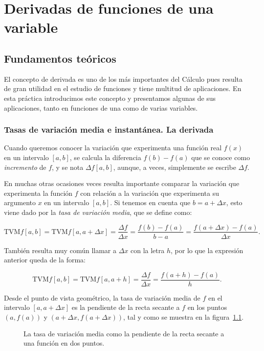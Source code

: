 \chapter{Derivadas de funciones de una variable}

\section{Fundamentos teóricos}
El concepto de derivada es uno de los más importantes del Cálculo
pues resulta de gran utilidad en el estudio de funciones y tiene
multitud de aplicaciones. En esta práctica introducimos este
concepto y presentamos algunas de sus aplicaciones, tanto en
funciones de una como de varias variables.

\subsection{Tasas de variación media e instantánea. La derivada}
Cuando queremos conocer la variación que experimenta una función
real $f(x)$ en un intervalo $[a,b]$, se calcula la diferencia
$f(b)-f(a)$ que se conoce como \emph{incremento} de $f$, y se nota
$\Delta f[a,b]$, aunque, a veces, simplemente se escribe $\Delta f$.

En muchas otras ocasiones veces resulta importante comparar la
variación que experimenta la función $f$ con relación a la variación
que experimenta su argumento $x$ en un intervalo $[a,b]$. Si tenemos
en cuenta que $b=a+\Delta x$, esto viene dado por la \emph{tasa de
variación media}, que se define como:

\[
\textrm{TVM} f[a,b]=\textrm{TVM} f[a,a+\Delta x]=\frac{\Delta
f}{\Delta x}=\frac{f(b)-f(a)}{b-a}=\frac{f(a+\Delta x )-f(a)}{\Delta
x}.
\]

También resulta muy común llamar a $\Delta x$ con la letra $h$, por
lo que la expresión anterior queda de la forma:

\[
\textrm{TVM} f[a,b]=\textrm{TVM} f[a,a+h]=\frac{\Delta f}{\Delta
x}=\frac{f(a+h)-f(a)}{h}.
\]

Desde el punto de vista geométrico, la tasa de variación media de
$f$ en el intervalo $[a , a+\Delta x]$ es la pendiente de la recta
secante a $f$ en los puntos $(a , f(a))$ y $(a+\Delta x, f(a+\Delta
x))$, tal y como se muestra en la figura~\ref{g:secante}.

\begin{figure}[h!]
\begin{center}
\scalebox{1}{}
\caption{La tasa de variación media como la pendiente de la recta
secante a una función en dos puntos.} \label{g:secante}
\end{center}
\end{figure}


